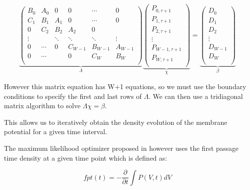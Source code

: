 \documentclass[10pt]{article}
\begin{document}
\begin{equation}
\underbrace{
\begin{pmatrix}
    B_0    & A_0   & 0      & 0      & \cdots  & 0       \\
    C_1    & B_1   & A_1    & 0      & \cdots  & 0       \\
    0      & C_2   & B_2    & A_2    & 0      &         \\
    \vdots &       & \ddots & \ddots & \ddots & \vdots  \\
    0      & \cdots & 0      & C_{W-1}& B_{W-1}& A_{W-1} \\
    0      & \cdots &        & 0      & C_W    & B_W     \\
\end{pmatrix}}_{\Lambda}
\underbrace{
\begin{pmatrix}
    P_{0,\tau+1}   \\
    P_{1,\tau+1}   \\
    P_{2,\tau+1}   \\
    \vdots         \\
    P_{W-1,\tau+1} \\
    P_{W,\tau+1}   \\
\end{pmatrix}}_{\chi}
=
\underbrace{
\begin{pmatrix}
    D_0     \\
    D_1     \\
    D_2     \\
    \vdots  \\
    D_{W-1} \\
    D_W     \\
\end{pmatrix}}_{\beta}
\end{equation}



However this matrix equation has W+1 equations, so we must use the
boundary conditions to specify the first and last rows of $\Lambda$.
We can then use a tridiagonal matrix algorithm to solve $\Lambda \chi
= \beta$.

This allows us to iteratively obtain the density evolution of the
membrane potential for a given time interval.

The maximum likelihood optimizer proposed in
\cite{PaninskiPillowSimoncelli} however uses the first passage time
density at a given time point which is defined as:

\begin{equation}
    fpt(t) = -\frac{\partial}{\partial t} \int P(V,t)dV
\end{equation}
\end{document}
